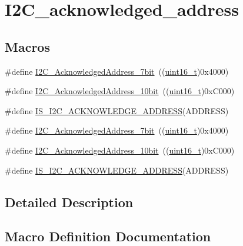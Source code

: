 \hypertarget{group___i2_c__acknowledged__address}{}\section{I2\+C\+\_\+acknowledged\+\_\+address}
\label{group___i2_c__acknowledged__address}
\subsection*{Macros}
\begin{DoxyCompactItemize}
\item 
\#define \hyperlink{group___i2_c__acknowledged__address_ga5e5ad2148f9da14457c7b59357acee97}{I2\+C\+\_\+\+Acknowledged\+Address\+\_\+7bit}~((\hyperlink{_p_e___types_8h_a1f1825b69244eb3ad2c7165ddc99c956}{uint16\+\_\+t})0x4000)
\item 
\#define \hyperlink{group___i2_c__acknowledged__address_gaf0bb8f71795f046ad9f6c1fc7fe0fc53}{I2\+C\+\_\+\+Acknowledged\+Address\+\_\+10bit}~((\hyperlink{_p_e___types_8h_a1f1825b69244eb3ad2c7165ddc99c956}{uint16\+\_\+t})0x\+C000)
\item 
\#define \hyperlink{group___i2_c__acknowledged__address_ga26a3af0a468f7226ed72fde27528c0ba}{I\+S\+\_\+\+I2\+C\+\_\+\+A\+C\+K\+N\+O\+W\+L\+E\+D\+G\+E\+\_\+\+A\+D\+D\+R\+E\+SS}(A\+D\+D\+R\+E\+SS)
\item 
\#define \hyperlink{group___i2_c__acknowledged__address_ga5e5ad2148f9da14457c7b59357acee97}{I2\+C\+\_\+\+Acknowledged\+Address\+\_\+7bit}~((\hyperlink{_p_e___types_8h_a1f1825b69244eb3ad2c7165ddc99c956}{uint16\+\_\+t})0x4000)
\item 
\#define \hyperlink{group___i2_c__acknowledged__address_gaf0bb8f71795f046ad9f6c1fc7fe0fc53}{I2\+C\+\_\+\+Acknowledged\+Address\+\_\+10bit}~((\hyperlink{_p_e___types_8h_a1f1825b69244eb3ad2c7165ddc99c956}{uint16\+\_\+t})0x\+C000)
\item 
\#define \hyperlink{group___i2_c__acknowledged__address_ga26a3af0a468f7226ed72fde27528c0ba}{I\+S\+\_\+\+I2\+C\+\_\+\+A\+C\+K\+N\+O\+W\+L\+E\+D\+G\+E\+\_\+\+A\+D\+D\+R\+E\+SS}(A\+D\+D\+R\+E\+SS)
\end{DoxyCompactItemize}


\subsection{Detailed Description}


\subsection{Macro Definition Documentation}
